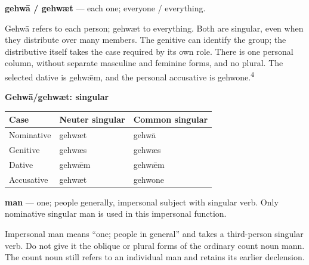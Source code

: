 \textbf{gehwā /\allowbreak{} gehwæt} — each one; everyone /\allowbreak{} everything.

Gehwā refers to each person; gehwæt to everything. Both are singular, even when they distribute over many members. The genitive can identify the group; the distributive itself takes the case required by its own role. There is one personal column, without separate masculine and feminine forms, and no plural. The selected dative is gehwǣm, and the personal accusative is gehwone.\textsuperscript{4}

\textbf{Gehwā/\allowbreak{}gehwæt: singular}

\par\begingroup
\fontsize{10.5}{13.2}\selectfont
\setlength{\LTleft}{0pt}\setlength{\LTright}{\fill}
\noindent
\begin{tabular}{@{}>{\raggedright\arraybackslash}p{39.459mm}>{\raggedright\arraybackslash}p{39.459mm}>{\raggedright\arraybackslash}p{39.459mm}@{}}
\toprule
\textbf{Case} & \textbf{Neuter singular} & \textbf{Common singular} \\
\midrule
Nominative & gehwæt & gehwā \\
Genitive & gehwæs & gehwæs \\
Dative & gehwǣm & gehwǣm \\
Accusative & gehwæt & gehwone \\
\bottomrule
\end{tabular}
\par\endgroup
\textbf{man} — one; people generally, impersonal subject with singular verb. Only nominative singular man is used in this impersonal function.

Impersonal man means “one; people in general” and takes a third-person singular verb. Do not give it the oblique or plural forms of the ordinary count noun mann. The count noun still refers to an individual man and retains its earlier declension.

